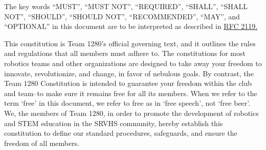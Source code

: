 \documentclass{constitution}
\author{Youwen Wu}
\date{\today}
\begin{document}
\maketitle


\vspace{12pt}
\linebreak
\small{The key words “MUST”, “MUST NOT”, “REQUIRED”, “SHALL”, “SHALL NOT”, “SHOULD”, “SHOULD NOT”, “RECOMMENDED”, “MAY”, and “OPTIONAL” in this document are to be interpreted as described in \href{https://datatracker.ietf.org/doc/html/rfc2119}{RFC 2119.}}


\begin{adjustwidth}{80pt}{80pt}
	\normalsize{
		This constitution is Team 1280's official governing text, and it outlines the rules and regulations that all members must adhere to.
		The constitutions for most robotics teams and other organizations are designed to take away your freedom to innovate, revolutionize, and change, in favor of nebulous goals. By contrast, the Team 1280 Constitution is intended to guarantee your freedom within the club and team--to make sure it remains free for all its members.
		When we refer to the term `free' in this document, we refer to free as in `free speech', not `free beer'.
		We, the members of Team 1280, in order to promote the development of robotics and STEM education in the SRVHS community, hereby establish this constitution to define our standard procedures, safeguards, and ensure the freedom of all members.
	}
\end{adjustwidth}

\normalsize
\vspace{12pt}
\vspace{12pt}



\end{document}

